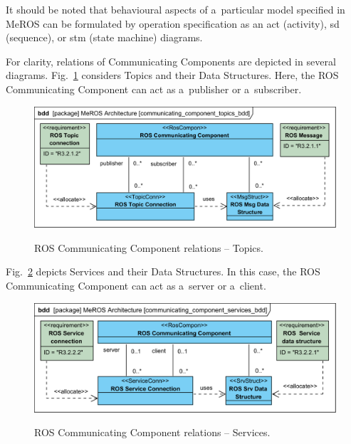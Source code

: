 \documentclass[11pt,oneside,a4paper]{report}
\begin{document}
	It should be noted that behavioural aspects of a~particular model specified in MeROS can be formulated by operation specification as an act (activity), sd (sequence), or stm (state machine) diagrams. 
	
	
	For clarity, relations of Communicating Components are depicted in several diagrams. Fig.~\ref{fig:communicating_component_topics_bdd} considers Topics and their Data Structures. Here, the ROS Communicating Component can act as a~publisher or a~subscriber.	
	 
	
	\begin{figure}[H]
		\centering
		\begin{center}
			{\includegraphics[scale=1.0]{diagrams/communicating_component_topics_bdd.png}}
		\end{center}
		\caption{ROS Communicating Component relations -- Topics.} 
		\label{fig:communicating_component_topics_bdd}
	\end{figure}
	
	\pagebreak
	
	Fig.~\ref{fig:communication_blocks_services_bdd} depicts Services and their Data Structures. In this case, the ROS Communicating Component can act as a~server or a~client.	
	
		
	\begin{figure}[H]
		\centering
		\begin{center}
			{\includegraphics[scale=1.0]{diagrams/communicating_component_services_bdd.png}}
		\end{center}
		\caption{ROS Communicating Component relations -- Services.} 
		\label{fig:communication_blocks_services_bdd}
	\end{figure}
	
\end{document}
